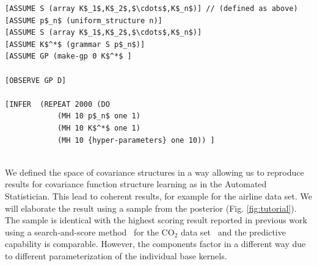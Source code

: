 \documentclass{article} %
\begin{document}
\begin{minipage}{\linewidth}
\scriptsize
\begin{lstlisting}[frame=single,label=alg:structureVent,caption=Venture Code for Bayesian GP Structure Learning,mathescape]
[ASSUME S (array K$_1$,K$_2$,$\cdots$,K$_n$)] // (defined as above)
[ASSUME p$_n$ (uniform_structure n)]
[ASSUME S (array K$_1$,K$_2$,$\cdots$,K$_n$)]
[ASSUME K$^*$ (grammar S p$_n$)]
[ASSUME GP (make-gp 0 K$^*$ ]

[OBSERVE GP D]

[INFER  (REPEAT 2000 (DO 
			(MH 10 p$_n$ one 1) 
			(MH 10 K$^*$ one 1) 
			(MH 10 {hyper-parameters} one 10)) ]


\end{lstlisting}

\end{minipage}

We defined the space of covariance structures in a way allowing us to reproduce results for covariance function structure learning as in the Automated Statistician. This lead to coherent results, for example for the airline data set. We will elaborate the result using a sample from the posterior (Fig. \ref{fig:tutorial}). The sample is identical with the highest scoring result reported in previous work using a search-and-score method~\citep{duvenaud2013structure} for the CO$_2$ data set~\citep{} and the predictive capability is comparable. However, the components factor in a different way due to different parameterization of the individual base kernels.
\end{document}
